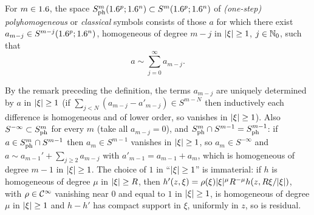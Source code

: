 \begin{definition}\label{euclidean:def:polyhomogeneous}
  For $m\in1.6$, the space $S^{m}_{\mathrm{ph}}(1.6^p;1.6^n)\subset S^m(1.6^p;1.6^n)$ of
  \emph{\textup{(}one-step\textup{)} polyhomogeneous} or \emph{classical}
  symbols consists of those $a$ for which there exist
  $a_{m-j}\in S^{m-j}(1.6^p;1.6^n)$, homogeneous of degree $m-j$ in $\lvert \xi\rvert\ge1$,
  $j\in\mathbb{N}_0$, such that
  \begin{equation*}
    a\sim\sum_{j=0}^\infty a_{m-j}.
  \end{equation*}
\end{definition}

By the remark preceding the definition, the terms $a_{m-j}$ are uniquely
determined by $a$ in $\lvert \xi\rvert\ge1$ (if $\sum_{j<N}(a_{m-j}-a'_{m-j})\in S^{m-N}$
then inductively each difference is homogeneous and of lower order, so vanishes
in $\lvert \xi\rvert\ge1$). Also $S^{-\infty}\subset S^{m}_{\mathrm{ph}}$ for every $m$ (take all
$a_{m-j}=0$), and $S^{m}_{\mathrm{ph}}\cap S^{m-1}=S^{m-1}_{\mathrm{ph}}$: if $a\in S^{m}_{\mathrm{ph}}\cap
S^{m-1}$ then $a_m\in S^{m-1}$ vanishes in $\lvert \xi\rvert\ge1$, so $a_m\in S^{-\infty}$ and
$a\sim a_{m-1}'+\sum_{j\ge2}a_{m-j}$ with $a'_{m-1}=a_{m-1}+a_m$, which is homogeneous
of degree $m-1$ in $\lvert \xi\rvert\ge1$. The choice of $1$ in
``$\lvert \xi\rvert\ge1$'' is immaterial: if $h$ is homogeneous of degree $\mu$ in
$\lvert \xi\rvert\ge R$, then
$h'(z,\xi)=\rho(\xi)\lvert \xi\rvert^\mu R^{-\mu}h(z,R\xi/\lvert \xi\rvert)$, with
$\rho\in\mathcal{C}^\infty$ vanishing near $0$ and equal to $1$ in $\lvert \xi\rvert\ge1$, is
homogeneous of degree $\mu$ in $\lvert \xi\rvert\ge1$ and $h-h'$ has compact support
in $\xi$, uniformly in $z$, so is residual.

